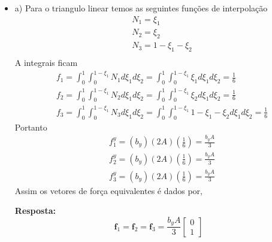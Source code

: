 \begin{itemize}
	\item a)
	Para o triangulo linear temos as seguintes funções de interpolação
	\begin{equation}
		\begin{split}
		&N_1 = \xi_1\\ 
		&N_2 = \xi_2\\ 
		&N_3 = 1 - \xi_1 - \xi_2\\ 
		\end{split}
	\end{equation}
	A integrais ficam
	\begin{equation}
		\begin{split}
			&f_1 = \int_{0}^{1} \int_{0}^{1-\xi_1}  N_1 d \xi_1 d \xi_2 = \int_{0}^{1} \int_{0}^{1-\xi_1}  \xi_1 d \xi_1 d \xi_2 = \frac{1}{6}\\ 
			&f_2 = \int_{0}^{1} \int_{0}^{1-\xi_1}  N_2 d \xi_1 d \xi_2 = \int_{0}^{1} \int_{0}^{1-\xi_1}  \xi_2 d \xi_1 d \xi_2 = \frac{1}{6}\\ 
			&f_3 = \int_{0}^{1} \int_{0}^{1-\xi_1}  N_3 d \xi_1 d \xi_2 = \int_{0}^{1} \int_{0}^{1-\xi_1}  1 - \xi_1 - \xi_2 d \xi_1 d \xi_2 = \frac{1}{6} 
		\end{split}
	\end{equation}
	Portanto
	\begin{equation}
		\begin{split}
			&f_1^y = (b_y) (2 A) \left(\frac{1}{6}\right) = \frac{b_y A}{3}\\ 
			&f_2^y = (b_y) (2 A) \left(\frac{1}{6}\right) = \frac{b_y A}{3}\\ 
			&f_3^y = (b_y) (2 A) \left(\frac{1}{6}\right) = \frac{b_y A}{3} 
		\end{split}
	\end{equation}
	Assim os vetores de força equivalentes é dados por,

	\color{blue}
	\textbf{Resposta:}
	\begin{equation}
		\mathbf{f}_1 = \mathbf{f}_2 = \mathbf{f}_3
		=
		\frac{b_y A}{3}
		\begin{bmatrix}
			0\\
			1
		\end{bmatrix}
	\end{equation}
	\color{black}
	

\end{itemize}
